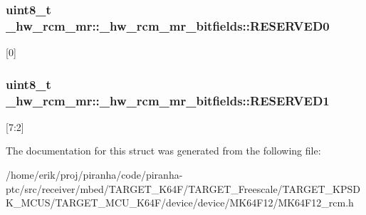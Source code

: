 \subsubsection[{\texorpdfstring{R\+E\+S\+E\+R\+V\+E\+D0}{RESERVED0}}]{\setlength{\rightskip}{0pt plus 5cm}uint8\+\_\+t \+\_\+hw\+\_\+rcm\+\_\+mr\+::\+\_\+hw\+\_\+rcm\+\_\+mr\+\_\+bitfields\+::\+R\+E\+S\+E\+R\+V\+E\+D0}\hypertarget{struct__hw__rcm__mr_1_1__hw__rcm__mr__bitfields_aa3d2da1748bb177743ff74075c168993}{}\label{struct__hw__rcm__mr_1_1__hw__rcm__mr__bitfields_aa3d2da1748bb177743ff74075c168993}
\mbox{[}0\mbox{]} 
\subsubsection[{\texorpdfstring{R\+E\+S\+E\+R\+V\+E\+D1}{RESERVED1}}]{\setlength{\rightskip}{0pt plus 5cm}uint8\+\_\+t \+\_\+hw\+\_\+rcm\+\_\+mr\+::\+\_\+hw\+\_\+rcm\+\_\+mr\+\_\+bitfields\+::\+R\+E\+S\+E\+R\+V\+E\+D1}\hypertarget{struct__hw__rcm__mr_1_1__hw__rcm__mr__bitfields_abf6ff1045628abeb614960c4f521b078}{}\label{struct__hw__rcm__mr_1_1__hw__rcm__mr__bitfields_abf6ff1045628abeb614960c4f521b078}
\mbox{[}7\+:2\mbox{]} 

The documentation for this struct was generated from the following file\+:\begin{DoxyCompactItemize}
\item 
/home/erik/proj/piranha/code/piranha-\/ptc/src/receiver/mbed/\+T\+A\+R\+G\+E\+T\+\_\+\+K64\+F/\+T\+A\+R\+G\+E\+T\+\_\+\+Freescale/\+T\+A\+R\+G\+E\+T\+\_\+\+K\+P\+S\+D\+K\+\_\+\+M\+C\+U\+S/\+T\+A\+R\+G\+E\+T\+\_\+\+M\+C\+U\+\_\+\+K64\+F/device/device/\+M\+K64\+F12/M\+K64\+F12\+\_\+rcm.\+h\end{DoxyCompactItemize}
